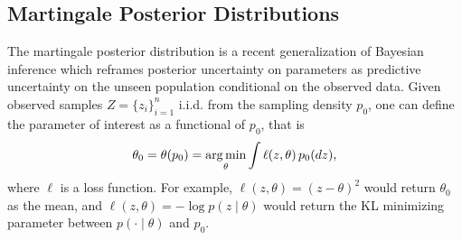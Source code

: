 
\subsection{Martingale Posterior Distributions}

The martingale posterior distribution \citep{fong2021martingale} is a recent generalization of Bayesian inference which reframes posterior uncertainty on parameters as {predictive} uncertainty on the unseen population conditional on the observed data. Given observed samples $Z = \{z_i\}_{i=1}^n$  i.i.d. from the sampling density $p_0$, one can define the parameter of interest as a functional of $p_0$, that is
$$
\theta_0 = \theta(p_0) =  \operatorname*{arg\,min}_\theta\int \ell(z,\theta)\, p_0(dz), 
$$
where $\ell$ is a loss function. For example, $\ell(z,\theta) =  (z-\theta)^2$ would return $\theta_0$ as the mean, and $\ell(z,\theta)= - \log p(z \mid \theta)$ would return the KL minimizing parameter between $p(\cdot \mid \theta)$ and $p_0$.

